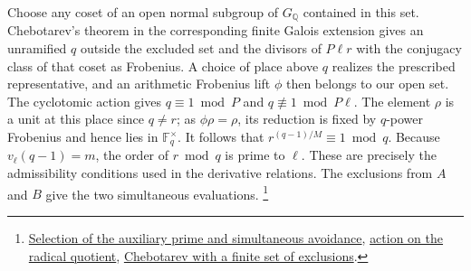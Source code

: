Choose any coset of an open normal subgroup of \(G_{\mathbb Q}\)
contained in this set. Chebotarev's theorem in the corresponding
finite Galois extension gives an unramified \(q\) outside the
excluded set and the divisors of \(P\ell r\) with the conjugacy
class of that coset as Frobenius. A choice of place above \(q\)
realizes the prescribed representative, and an arithmetic Frobenius
lift \(\phi\) then belongs to our open set. The cyclotomic action
gives \(q\equiv1\bmod P\) and \(q\not\equiv1\bmod P\ell\).
The element \(\rho\) is a unit at this place since \(q\ne r\);
as \(\phi\rho=\rho\), its reduction is fixed by \(q\)-power
Frobenius and hence lies in \(\mathbb F_q^\times\). It follows
that \(r^{(q-1)/M}\equiv1\bmod q\). Because
\(v_\ell(q-1)=m\), the order of \(r\bmod q\) is prime to
\(\ell\). These are precisely the admissibility conditions used
in the derivative relations. The exclusions from \(A\) and \(B\)
give the two simultaneous evaluations.
\footnote{\href{https://github.com/ChristianKudeba/alpoge-rh-verification/blob/alpoge-source-7cbf7a0c/src/Development/AutomorphicArithmetic/AutomorphicVarieties/PrimitiveFrobeniusFixed/AddPowNsmul.lean}{Selection of the auxiliary prime and simultaneous avoidance},
\href{https://github.com/ChristianKudeba/alpoge-rh-verification/blob/alpoge-source-7cbf7a0c/src/Development/AutomorphicArithmetic/AutomorphicVarieties/PrimitiveFrobeniusFixed/RadEqv.lean}{action on the radical quotient},
\href{https://github.com/ChristianKudeba/alpoge-rh-verification/blob/alpoge-source-7cbf7a0c/src/Development/AutomorphicArithmetic/AutomorphicVarieties/PrimitiveFrobeniusFixed/ChebQ.lean}{Chebotarev with a finite set of exclusions}.}
